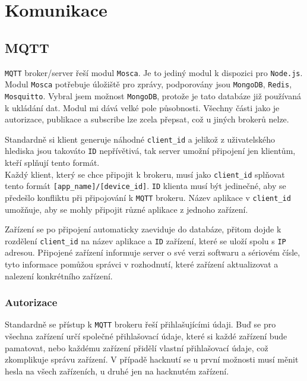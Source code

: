 \documentclass[czech,BP]{thesiskiv}
\begin{document}
	\section{Komunikace}
		\subsection{MQTT}
			\texttt{MQTT} broker/server řeší modul \texttt{Mosca}. Je to jediný modul k dispozici pro \texttt{Node.js}. Modul \texttt{Mosca} potřebuje úložiště pro zprávy, podporovány jsou \texttt{MongoDB}, \texttt{Redis}, \texttt{Mosquitto}. Vybral jsem možnost \texttt{MongoDB}, protože je tato databáze již používaná k ukládání dat. Modul mi dává velké pole působnosti. Všechny části jako je autorizace, publikace a subscribe lze zcela přepsat, což u jiných brokerů nelze.
			
			Standardně si klient generuje náhodné \texttt{client\_id} a jelikož z uživatelského hlediska jsou takováto \texttt{ID} nepřívětivá, tak server umožní připojení jen klientům, kteří splňují tento formát.\\Každý klient, který se chce připojit k brokeru, musí jako \texttt{client\_id} splňovat tento formát \texttt{[app\_name]/[device\_id]}. \texttt{ID} klienta musí být jedinečné, aby se předešlo konfliktu při připojování k \texttt{MQTT} brokeru. 
				Název aplikace v \texttt{client\_id} umožňuje, aby se mohly připojit různé aplikace z jednoho zařízení. 

			Zařízení se po připojení automaticky zaeviduje do databáze, přitom dojde k rozdělení \texttt{client\_id} na název aplikace a \texttt{ID} zařízení, které se uloží spolu s \texttt{IP} adresou. 
			Připojené zařízení informuje server o své verzi softwaru a sériovém čísle, tyto informace pomůžou správci v rozhodnutí, které zařízení aktualizovat a nalezení konkrétního zařízení. 
			
			
		
			\subsubsection{Autorizace}
		Standardně se přístup k \texttt{MQTT} brokeru řeší přihlašujícími údaji. 
		Buď se pro všechna zařízení určí společné přihlašovací údaje, které si každé zařízení bude pamatovat, nebo každému zařízení přidělí vlastní přihlašovací údaje, což zkomplikuje správu zařízení.		
 		V případě hacknutí se u první možnosti musí měnit hesla na všech zařízeních, u druhé jen na hacknutém zařízení.
 		
\end{document}

